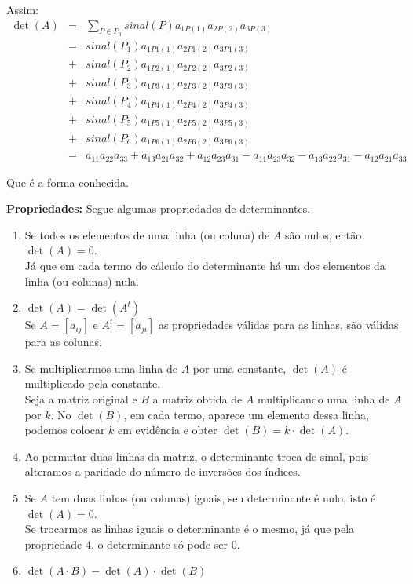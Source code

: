 \documentclass[oneside,a4paper,12pt]{article}
\begin{document}
Assim:
\begin{eqnarray*}
	\det(A) &=& \sum_{P \in P_{3}} sinal(P) a_{1P(1)}a_{2P(2)}a_{3P(3)}	\\
	&=& sinal(P_1) a_{1P1(1)}a_{2P1(2)}a_{3P1(3)}	\\
	&+& sinal(P_2) a_{1P2(1)}a_{2P2(2)}a_{3P2(3)}	\\
	&+& sinal(P_3) a_{1P3(1)}a_{2P3(2)}a_{3P3(3)}	\\
	&+& sinal(P_4) a_{1P4(1)}a_{2P4(2)}a_{3P4(3)}	\\
	&+& sinal(P_5) a_{1P5(1)}a_{2P5(2)}a_{3P5(3)}	\\
	&+& sinal(P_6) a_{1P6(1)}a_{2P6(2)}a_{3P6(3)}	\\
	&=& a_{11}a_{22}a_{33}+a_{13}a_{21}a_{32}+a_{12}a_{23}a_{31}-a_{11}a_{23}a_{32}-a_{13}a_{22}a_{31}-a_{12}a_{21}a_{33}
\end{eqnarray*}

Que é a forma conhecida.

\textbf{Propriedades: }Segue algumas propriedades de determinantes.

\begin{enumerate}
	\item Se todos os elementos de uma linha (ou coluna) de $A$ são nulos, então $\det(A)=0$. \\ Já que em cada termo do cálculo do determinante há um dos elementos da linha (ou colunas) nula.
	\item $\det(A)=\det(A^t)$ \\ Se $A=[a_{ij}]$ e $A^t=[a_{ji}]$ as propriedades válidas para as linhas, são válidas para as colunas.
	\item Se multiplicarmos uma linha de $A$ por uma constante, $\det(A)$ é multiplicado pela constante. \\ Seja a matriz original e $B$ a matriz obtida de $A$ multiplicando uma linha de $A$ por $k$. No $\det(B)$, em cada termo, aparece um elemento dessa linha, podemos colocar $k$ em evidência e obter $\det(B) = k \cdot \det(A)$.
	\item Ao permutar duas linhas da matriz, o determinante troca de sinal, pois alteramos a paridade do número de inversões dos índices.
	\item Se $A$ tem duas linhas (ou colunas) iguais, seu determinante é nulo, isto é $\det(A)=0$. \\ Se trocarmos as linhas iguais o determinante é o mesmo, já que pela propriedade $4$, o determinante só pode ser $0$.
	\item $\det(A \cdot B) - \det(A) \cdot \det(B)$
\end{enumerate}
	
\end{document}
